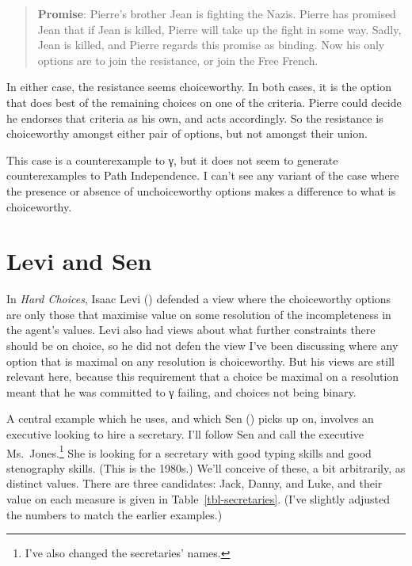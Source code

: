 \documentclass[
  11pt,
  letterpaper,
  DIV=11,
  numbers=noendperiod,
  twoside]{scrartcl}
\begin{document}
\begin{quote}
\textbf{Promise}: Pierre's brother Jean is fighting the Nazis. Pierre
has promised Jean that if Jean is killed, Pierre will take up the fight
in some way. Sadly, Jean is killed, and Pierre regards this promise as
binding. Now his only options are to join the resistance, or join the
Free French.
\end{quote}

In either case, the resistance seems choiceworthy. In both cases, it is
the option that does best of the remaining choices on one of the
criteria. Pierre could decide he endorses that criteria as his own, and
acts accordingly. So the resistance is choiceworthy amongst either pair
of options, but not amongst their union.

This case is a counterexample to γ, but it does not seem to generate
counterexamples to Path Independence. I can't see any variant of the
case where the presence or absence of unchoiceworthy options makes a
difference to what is choiceworthy.

\section{Levi and Sen}\label{sec-levisen}

In \emph{Hard Choices}, Isaac Levi ()
defended a view where the choiceworthy options are only those that
maximise value on some resolution of the incompleteness in the agent's
values. Levi also had views about what further constraints there should
be on choice, so he did not defen the view I've been discussing where
any option that is maximal on any resolution is choiceworthy. But his
views are still relevant here, because this requirement that a choice be
maximal on a resolution meant that he was committed to γ failing, and
choices not being binary.

A central example which he uses, and which Sen
() picks up on, involves an executive
looking to hire a secretary. I'll follow Sen and call the executive
Ms.~Jones.\footnote{I've also changed the secretaries' names.} She is
looking for a secretary with good typing skills and good stenography
skills. (This is the 1980s.) We'll conceive of these, a bit arbitrarily,
as distinct values. There are three candidates: Jack, Danny, and Luke,
and their value on each measure is given in Table~\ref{tbl-secretaries}.
(I've slightly adjusted the numbers to match the earlier examples.)
\end{document}
